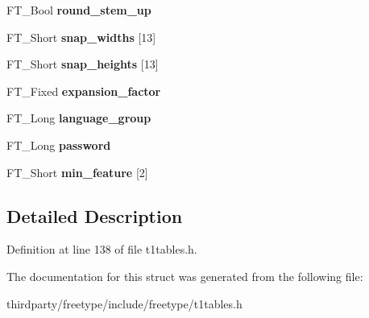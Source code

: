 \begin{DoxyCompactItemize}
\mbox{\label{struct_p_s___private_rec___a96b9729811d02146a87ffdc5c254bbe9}} 
F\+T\+\_\+\+Bool {\bfseries round\+\_\+stem\+\_\+up}
\item 
\mbox{\label{struct_p_s___private_rec___a39cf1a4b21280bf8082ccba0f4824a8a}} 
F\+T\+\_\+\+Short {\bfseries snap\+\_\+widths} \mbox{[}13\mbox{]}
\item 
\mbox{\label{struct_p_s___private_rec___a3583caf0cc05de2afac098574ed0bc4b}} 
F\+T\+\_\+\+Short {\bfseries snap\+\_\+heights} \mbox{[}13\mbox{]}
\item 
\mbox{\label{struct_p_s___private_rec___a45cf6e07c4c26f029e66998e6cad9fa0}} 
F\+T\+\_\+\+Fixed {\bfseries expansion\+\_\+factor}
\item 
\mbox{\label{struct_p_s___private_rec___afc2a7f950a174577ebfc062bb1598f5c}} 
F\+T\+\_\+\+Long {\bfseries language\+\_\+group}
\item 
\mbox{\label{struct_p_s___private_rec___a309a871cdeb6f658d8fbff23fa13b667}} 
F\+T\+\_\+\+Long {\bfseries password}
\item 
\mbox{\label{struct_p_s___private_rec___af8c829e03c424b1f12b2c9cd4041a868}} 
F\+T\+\_\+\+Short {\bfseries min\+\_\+feature} \mbox{[}2\mbox{]}
\end{DoxyCompactItemize}


\subsection{Detailed Description}


Definition at line 138 of file t1tables.\+h.



The documentation for this struct was generated from the following file\+:\begin{DoxyCompactItemize}
\item 
thirdparty/freetype/include/freetype/t1tables.\+h\end{DoxyCompactItemize}
